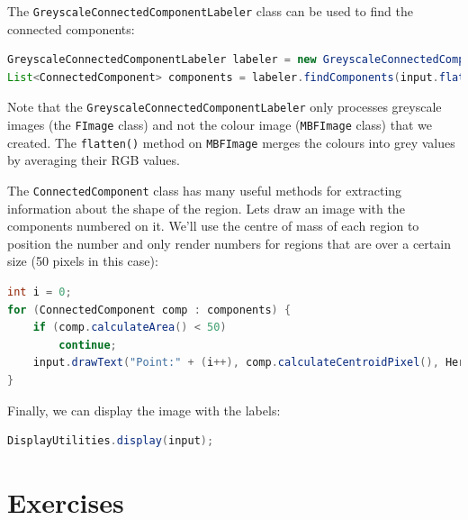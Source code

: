 The \verb+GreyscaleConnectedComponentLabeler+ class can be used to find the connected components:
\begin{lstlisting}[language=java]
GreyscaleConnectedComponentLabeler labeler = new GreyscaleConnectedComponentLabeler();
List<ConnectedComponent> components = labeler.findComponents(input.flatten());
\end{lstlisting}
Note that the \verb+GreyscaleConnectedComponentLabeler+ 
only processes greyscale images 
(the \verb+FImage+ class) and not the colour image (\verb+MBFImage+ class) that we created. 
The \verb+flatten()+ method on \verb+MBFImage+ merges the colours into grey values by 
averaging their RGB values.

The \verb+ConnectedComponent+ class has many useful methods for extracting information 
about the shape of the region. Lets draw an image with the components numbered on it. We'll use the 
centre of mass of each region to position the number and only render numbers for regions that 
are over a certain size (50 pixels in this case):
\begin{lstlisting}[language=java]
int i = 0;
for (ConnectedComponent comp : components) {
    if (comp.calculateArea() < 50) 
        continue;
    input.drawText("Point:" + (i++), comp.calculateCentroidPixel(), HersheyFont.TIMES_MEDIUM,20);
}
\end{lstlisting}
Finally, we can display the image with the labels:
\begin{lstlisting}[language=java]
DisplayUtilities.display(input);
\end{lstlisting}

\pagebreak
\section*{Exercises}
